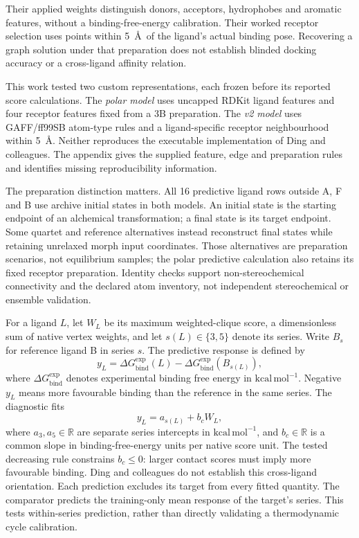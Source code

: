 \documentclass{article}
\begin{document}
Their applied weights distinguish donors, acceptors, hydrophobes and aromatic features, without a binding-free-energy calibration. Their worked receptor selection uses points within 5~\AA\ of the ligand's actual binding pose. Recovering a graph solution under that preparation does not establish blinded docking accuracy or a cross-ligand affinity relation.\cite{P}

This work tested two custom representations, each frozen before its reported score calculations. The \emph{polar model} uses uncapped RDKit ligand features and four receptor features fixed from a 3B preparation. The \emph{v2 model} uses GAFF/ff99SB atom-type rules and a ligand-specific receptor neighbourhood within 5~\AA. Neither reproduces the executable implementation of Ding and colleagues. The appendix gives the supplied feature, edge and preparation rules and identifies missing reproducibility information.

The preparation distinction matters. All 16 predictive ligand rows outside A, F and B use archive initial states in both models. An initial state is the starting endpoint of an alchemical transformation; a final state is its target endpoint. Some quartet and reference alternatives instead reconstruct final states while retaining unrelaxed morph input coordinates. Those alternatives are preparation scenarios, not equilibrium samples; the polar predictive calculation also retains its fixed receptor preparation. Identity checks support non-stereochemical connectivity and the declared atom inventory, not independent stereochemical or ensemble validation.

For a ligand \(L\), let \(W_L\) be its maximum weighted-clique score, a dimensionless sum of native vertex weights, and let \(s(L)\in\{3,5\}\) denote its series. Write \(B_s\) for reference ligand B in series \(s\). The predictive response is defined by
\[
 y_L=\Delta G_{\mathrm{bind}}^{\mathrm{exp}}(L)
       -\Delta G_{\mathrm{bind}}^{\mathrm{exp}}(B_{s(L)}),
\]
where \(\Delta G_{\mathrm{bind}}^{\mathrm{exp}}\) denotes experimental binding free energy in \(\mathrm{kcal\,mol^{-1}}\). Negative \(y_L\) means more favourable binding than the reference in the same series. The diagnostic fits
\[
 y_L=a_{s(L)}+b_cW_L,
\]
where \(a_3,a_5\in\mathbb R\) are separate series intercepts in \(\mathrm{kcal\,mol^{-1}}\), and \(b_c\in\mathbb R\) is a common slope in binding-free-energy units per native score unit. The tested decreasing rule constrains \(b_c\leq0\): larger contact scores must imply more favourable binding. Ding and colleagues do not establish this cross-ligand orientation. Each prediction excludes its target from every fitted quantity. The comparator predicts the training-only mean response of the target's series. This tests within-series prediction, rather than directly validating a thermodynamic cycle calibration.
\end{document}
